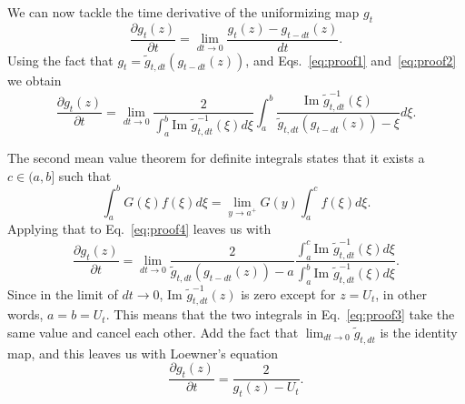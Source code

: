 We can now tackle the time derivative of the uniformizing map $g_t$
\begin{equation}
    \frac{\partial g_{t}\left(z\right)}{\partial t}=
    \lim_{dt\rightarrow0}\frac{g_{t}\left(z\right)-g_{t-dt}\left(z\right)}{dt}.
\end{equation}
Using the fact that $g_{t}=\tilde{g}_{t,dt}\left(g_{t-dt}\left(z\right)\right)$,
and Eqs.~\ref{eq:proof1} and~\ref{eq:proof2} we obtain
\begin{equation}
    \frac{\partial g_{t}\left(z\right)}{\partial t}=
    \lim_{dt\rightarrow0}\frac{2}
    {\int_{a}^{b}\mbox{Im }\tilde{g}_{t,dt}^{-1}\left(\xi\right)d\xi}
    \int_{a}^{b}
    \frac{\mbox{Im }\tilde{g}_{t,dt}^{-1}\left(\xi\right)}
    {\tilde{g}_{t,dt}\left(g_{t-dt}\left(z\right)\right)-\xi}d\xi.
    \label{eq:proof4}
\end{equation}

The second mean value theorem for definite integrals states that
it exists a $c\in(a,b]$ such that
\begin{equation}
    \int_{a}^{b}G\left(\xi\right)f\left(\xi\right)d\xi=
    \lim_{y\rightarrow a^+}G\left(y\right)\int_{a}^{c}f\left(\xi\right)d\xi.
\end{equation}
Applying that to Eq.~\ref{eq:proof4} leaves us with
\begin{equation}
    \label{eq:proof3}
     \frac{\partial g_{t}\left(z\right)}{\partial t}=
     \lim_{dt\rightarrow0}
     \frac{2}{\tilde{g}_{t,dt}\left(g_{t-dt}\left(z\right)\right)-a}
     \frac{\int_{a}^{c}\mbox{Im }\tilde{g}_{t,dt}^{-1}\left(\xi\right)d\xi}
          {\int_{a}^{b}\mbox{Im }\tilde{g}_{t,dt}^{-1}\left(\xi\right)d\xi}.
\end{equation}
Since in the limit of $dt\rightarrow0$, $\mbox{Im }\tilde{g}_{t,dt}^{-1}(z)$ is
zero except for $z=U_t$, in other words, $a=b=U_t$. This means that the two
integrals in Eq.~\ref{eq:proof3} take the same value and cancel each other. Add
the fact that $\lim_{dt\rightarrow 0}\tilde{g}_{t,dt}$ is the identity map, and
this leaves us with Loewner's equation
\begin{equation}
    \frac{\partial g_t(z)}{\partial t} = \frac{2}{g_t(z) - U_t}.
\end{equation}
